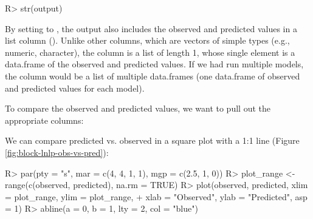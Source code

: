 \documentclass[article]{jss}
\begin{document}
\begin{Schunk}
\begin{Sinput}
R> str(output)
\end{Sinput}
\end{Schunk}

By setting  to , the output also includes the observed and predicted values in a list column (). Unlike other columns, which are vectors of simple types (e.g., numeric, character), the  column is a list of length 1, whose single element is a data.frame of the observed and predicted values. If we had run multiple models, the  column would be a list of multiple data.frames (one data.frame of observed and predicted values for each model).

To compare the observed and predicted values, we want to pull out the appropriate columns:
\begin{Schunk}
\end{Schunk}

We can compare predicted vs. observed in a square plot with a 1:1 line (Figure \ref{fig:block-lnlp-obs-vs-pred}):

\begin{Schunk}
\begin{Sinput}
R> par(pty = "s", mar = c(4, 4, 1, 1), mgp = c(2.5, 1, 0))
R> plot_range <- range(c(observed, predicted), na.rm = TRUE)
R> plot(observed, predicted, xlim = plot_range, ylim = plot_range,
+       xlab = "Observed", ylab = "Predicted", asp = 1)
R> abline(a = 0, b = 1, lty = 2, col = "blue")
\end{Sinput}
\end{Schunk}
\end{document}

